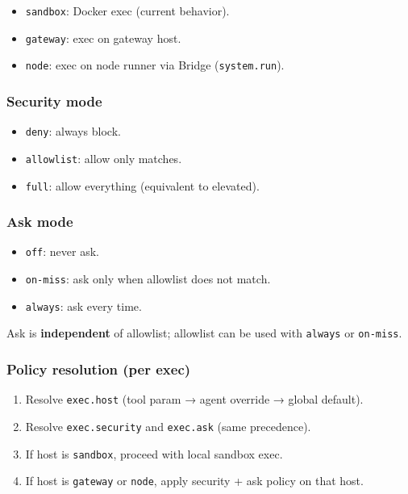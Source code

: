 \begin{itemize}
  \item \texttt{sandbox}: Docker exec (current behavior).
  \item \texttt{gateway}: exec on gateway host.
  \item \texttt{node}: exec on node runner via Bridge (\texttt{system.run}).
\end{itemize}


\subsubsection{Security mode}


\begin{itemize}
  \item \texttt{deny}: always block.
  \item \texttt{allowlist}: allow only matches.
  \item \texttt{full}: allow everything (equivalent to elevated).
\end{itemize}


\subsubsection{Ask mode}


\begin{itemize}
  \item \texttt{off}: never ask.
  \item \texttt{on-miss}: ask only when allowlist does not match.
  \item \texttt{always}: ask every time.
\end{itemize}


Ask is \textbf{independent} of allowlist; allowlist can be used with \texttt{always} or \texttt{on-miss}.

\subsubsection{Policy resolution (per exec)}


\begin{enumerate}
  \item Resolve \texttt{exec.host} (tool param → agent override → global default).
  \item Resolve \texttt{exec.security} and \texttt{exec.ask} (same precedence).
  \item If host is \texttt{sandbox}, proceed with local sandbox exec.
  \item If host is \texttt{gateway} or \texttt{node}, apply security + ask policy on that host.
\end{enumerate}



